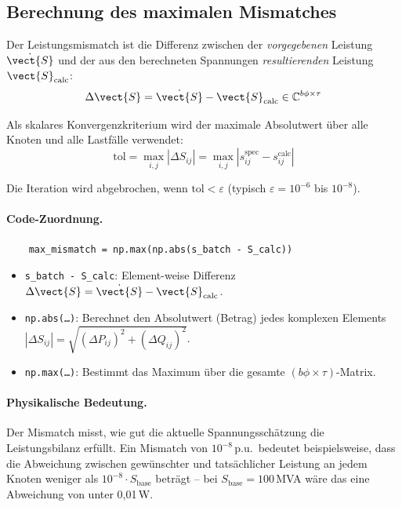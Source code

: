 \subsection{Berechnung des maximalen Mismatches}
\label{subsec:mismatch}

Der Leistungsmismatch ist die Differenz zwischen der \textit{vorgegebenen} Leistung $\dot{\vect{S}}$ und der aus den berechneten Spannungen \textit{resultierenden} Leistung $\vect{S}_{\text{calc}}$:
\begin{equation}
	\Delta \vect{S} = \dot{\vect{S}} - \vect{S}_{\text{calc}} \in \mathbb{C}^{b\phi \times \tau}
	\label{eq:mismatch_matrix}
\end{equation}

Als skalares Konvergenzkriterium wird der maximale Absolutwert über alle Knoten und alle Lastfälle verwendet:
\begin{equation}
	\text{tol} = \max_{i,j} |\Delta S_{ij}| = \max_{i,j} |s_{ij}^{\text{spec}} - s_{ij}^{\text{calc}}|
	\label{eq:tol_def}
\end{equation}

Die Iteration wird abgebrochen, wenn $\text{tol} < \varepsilon$ (typisch $\varepsilon = 10^{-6}$ bis $10^{-8}$).

\paragraph{Code-Zuordnung.}
\begin{verbatim}
	max_mismatch = np.max(np.abs(s_batch - S_calc))
\end{verbatim}

\begin{itemize}
	\item \texttt{s\_batch - S\_calc}: Element-weise Differenz $\Delta \vect{S} = \dot{\vect{S}} - \vect{S}_{\text{calc}}$.
	\item \texttt{np.abs(\ldots)}: Berechnet den Absolutwert (Betrag) jedes komplexen Elements $|\Delta S_{ij}| = \sqrt{(\Delta P_{ij})^2 + (\Delta Q_{ij})^2}$.
	\item \texttt{np.max(\ldots)}: Bestimmt das Maximum über die gesamte $(b\phi \times \tau)$-Matrix.
\end{itemize}

\paragraph{Physikalische Bedeutung.} Der Mismatch misst, wie gut die aktuelle Spannungsschätzung die Leistungsbilanz erfüllt. Ein Mismatch von $10^{-8}$\,p.u.\ bedeutet beispielsweise, dass die Abweichung zwischen gewünschter und tatsächlicher Leistung an jedem Knoten weniger als $10^{-8} \cdot S_{\text{base}}$ beträgt -- bei $S_{\text{base}} = 100$\,MVA wäre das eine Abweichung von unter 0{,}01\,W.

